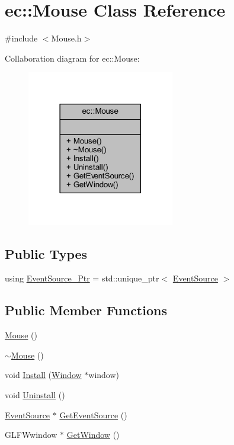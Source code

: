 \hypertarget{classec_1_1_mouse}{}\section{ec\+:\+:Mouse Class Reference}
\label{classec_1_1_mouse}


{\ttfamily \#include $<$Mouse.\+h$>$}



Collaboration diagram for ec\+:\+:Mouse\+:
\nopagebreak
\begin{figure}[H]
\begin{center}
\leavevmode
\includegraphics[width=182pt]{classec_1_1_mouse__coll__graph}
\end{center}
\end{figure}
\subsection*{Public Types}
\begin{DoxyCompactItemize}
\item 
using \mbox{\hyperlink{classec_1_1_mouse_a6aa210c1821f23f8685a544a587ae11a}{Event\+Source\+\_\+\+Ptr}} = std\+::unique\+\_\+ptr$<$ \mbox{\hyperlink{classec_1_1_event_source}{Event\+Source}} $>$
\end{DoxyCompactItemize}
\subsection*{Public Member Functions}
\begin{DoxyCompactItemize}
\item 
\mbox{\hyperlink{classec_1_1_mouse_ac1154831feadd646ecabad6dc1d42136}{Mouse}} ()
\item 
\mbox{\hyperlink{classec_1_1_mouse_a49441335e64c7bf098217f0698975aa4}{$\sim$\+Mouse}} ()
\item 
void \mbox{\hyperlink{classec_1_1_mouse_adcaab7abcc1f1c27036949200b75a57a}{Install}} (\mbox{\hyperlink{classec_1_1_window}{Window}} $\ast$window)
\item 
void \mbox{\hyperlink{classec_1_1_mouse_afa7fa66642de310a6395c0653ec3f8ac}{Uninstall}} ()
\item 
\mbox{\hyperlink{classec_1_1_event_source}{Event\+Source}} $\ast$ \mbox{\hyperlink{classec_1_1_mouse_afe0858cb6822eb8bd996584c28c5b1dc}{Get\+Event\+Source}} ()
\item 
G\+L\+F\+Wwindow $\ast$ \mbox{\hyperlink{classec_1_1_mouse_a85326de310aa289dd72c075bef933aa9}{Get\+Window}} ()
\end{DoxyCompactItemize}


